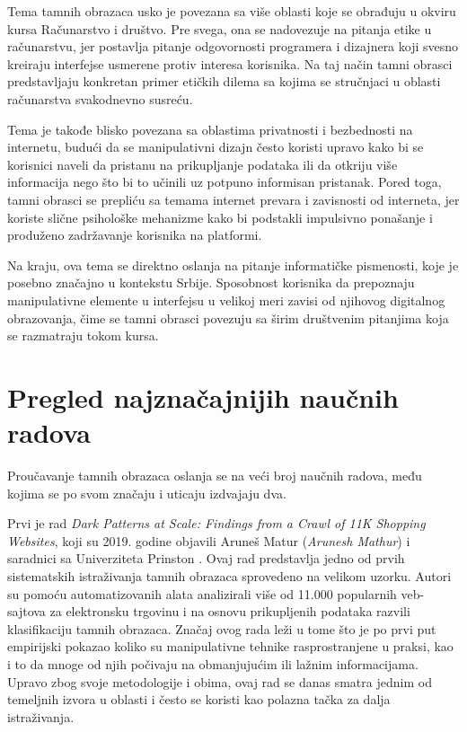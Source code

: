 \documentclass[12pt,a4paper]{article}
\begin{document}
Tema tamnih obrazaca usko je povezana sa više oblasti koje se obrađuju u okviru kursa Računarstvo i društvo. Pre svega, ona se nadovezuje na pitanja etike u računarstvu, jer postavlja pitanje odgovornosti programera i dizajnera koji svesno kreiraju interfejse usmerene protiv interesa korisnika. Na taj način tamni obrasci predstavljaju konkretan primer etičkih dilema sa kojima se stručnjaci u oblasti računarstva svakodnevno susreću.

Tema je takođe blisko povezana sa oblastima privatnosti i bezbednosti na internetu, budući da se manipulativni dizajn često koristi upravo kako bi se korisnici naveli da pristanu na prikupljanje podataka ili da otkriju više informacija nego što bi to učinili uz potpuno informisan pristanak. Pored toga, tamni obrasci se prepliću sa temama internet prevara i zavisnosti od interneta, jer koriste slične psihološke mehanizme kako bi podstakli impulsivno ponašanje i produženo zadržavanje korisnika na platformi.

Na kraju, ova tema se direktno oslanja na pitanje informatičke pismenosti, koje je posebno značajno u kontekstu Srbije. Sposobnost korisnika da prepoznaju manipulativne elemente u interfejsu u velikoj meri zavisi od njihovog digitalnog obrazovanja, čime se tamni obrasci povezuju sa širim društvenim pitanjima koja se razmatraju tokom kursa.

\section{Pregled najznačajnijih naučnih radova}

Proučavanje tamnih obrazaca oslanja se na veći broj naučnih radova, među kojima se po svom značaju i uticaju izdvajaju dva.

Prvi je rad \emph{Dark Patterns at Scale: Findings from a Crawl of 11K Shopping Websites}, koji su 2019. godine objavili Aruneš Matur (\emph{Arunesh Mathur}) i saradnici sa Univerziteta Prinston \cite{mathur2019dark}. Ovaj rad predstavlja jedno od prvih sistematskih istraživanja tamnih obrazaca sprovedeno na velikom uzorku. Autori su pomoću automatizovanih alata analizirali više od 11.000 popularnih veb-sajtova za elektronsku trgovinu i na osnovu prikupljenih podataka razvili klasifikaciju tamnih obrazaca. Značaj ovog rada leži u tome što je po prvi put empirijski pokazao koliko su manipulativne tehnike rasprostranjene u praksi, kao i to da mnoge od njih počivaju na obmanjujućim ili lažnim informacijama. Upravo zbog svoje metodologije i obima, ovaj rad se danas smatra jednim od temeljnih izvora u oblasti i često se koristi kao polazna tačka za dalja istraživanja.
\end{document}

